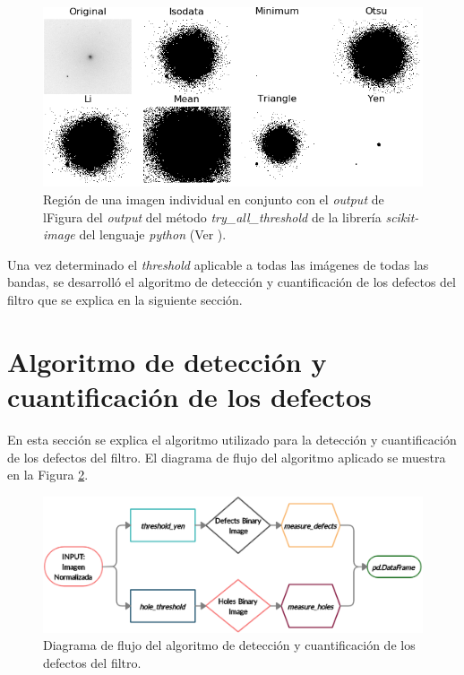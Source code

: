 \begin{enumerate}
\begin{figure}[H]
	\centering
	\includegraphics[scale=1.2]{Figs/defectosZEISS/thresh_vivos_compar3.png}
	\caption{Región de una imagen individual en conjunto con el \textit{output} de lFigura del \textit{output} del método \textit{try\_all\_threshold} de la librería \textit{scikit-image} del lenguaje \textit{python} (Ver \href{https://github.com/jrr1984/defects_analysis/blob/master/MAIN/try_all_thresholds.py}{\faGithub}).} 
	\label{fig:threshcom2}
\end{figure}
\end{enumerate}
\hspace{0.5cm}Una vez determinado el \textit{threshold} aplicable a todas las imágenes de todas las bandas, se desarrolló el algoritmo de detección y cuantificación de los defectos del filtro que se explica en la siguiente sección.

\singlespacing
\section{Algoritmo de detección y cuantificación de los defectos \href{https://github.com/jrr1984/defects_analysis/blob/master/MAIN/defects_thresholding.py}{\faGithub}}

\hspace{0.5cm}En esta sección se explica el algoritmo utilizado para la detección y cuantificación de los defectos del filtro. El diagrama de flujo del algoritmo aplicado se muestra en la Figura \ref{fig:diagflujoalgor}. 

\begin{figure}[H]
\centering
\includegraphics[scale=0.8]{Figs/cuantificaciondefectos/diag_flujoalgor.png}
\caption{Diagrama de flujo del algoritmo de detección y cuantificación de los defectos del filtro.}
\label{fig:diagflujoalgor}
\end{figure}


